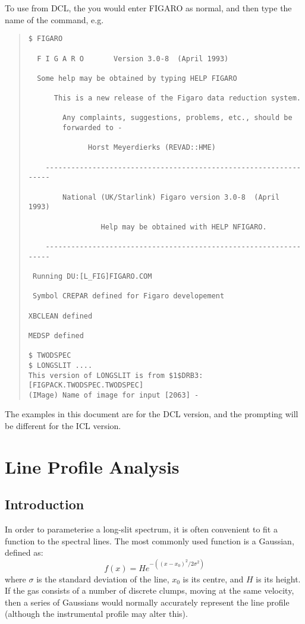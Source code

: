 To use from DCL, the you would enter FIGARO as normal, and then type the
name of the command, e.g.
\begin{quote}\begin{verbatim}
$ FIGARO

  F I G A R O       Version 3.0-8  (April 1993)

  Some help may be obtained by typing HELP FIGARO

      This is a new release of the Figaro data reduction system.

        Any complaints, suggestions, problems, etc., should be
        forwarded to -

              Horst Meyerdierks (REVAD::HME)

    -----------------------------------------------------------------

        National (UK/Starlink) Figaro version 3.0-8  (April 1993)

                 Help may be obtained with HELP NFIGARO.

    -----------------------------------------------------------------

 Running DU:[L_FIG]FIGARO.COM

 Symbol CREPAR defined for Figaro developement

XBCLEAN defined

MEDSP defined

$ TWODSPEC
$ LONGSLIT ....
This version of LONGSLIT is from $1$DRB3:[FIGPACK.TWODSPEC.TWODSPEC]
(IMage) Name of image for input [2063] - 
\end{verbatim}\end{quote}
The examples in this document are for the DCL version, and the prompting
will be different for the ICL version.

\section{Line Profile Analysis}

\subsection{Introduction}

In order to parameterise a long-slit spectrum, it is often
convenient to fit a function to the spectral lines.
The most commonly used function is a Gaussian, defined as:
\[
     f(x) = H e^{-((x-x_{0})^{2}/2\sigma^{2})}
\]
where $\sigma$ is the standard deviation of the line, $x_{0}$ is its
centre, and $H$ is its height.
If the gas consists of a number of discrete clumps, moving at the same
velocity, then a series of Gaussians would normally accurately represent
the line profile (although the instrumental profile may alter this).

